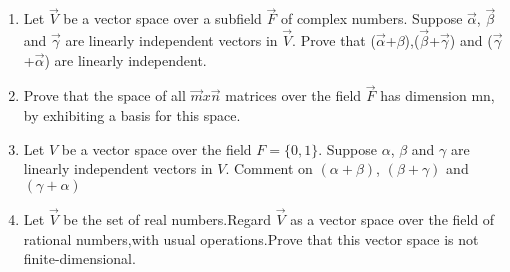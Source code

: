 \begin{enumerate}[label=\thesubsection.\arabic*.,ref=\thesubsection.\theenumi]
%
\\
\solution

%
\item    Let $\vec{V}$ be a vector space over a subfield $\vec{F}$ of complex numbers. Suppose $\vec{\alpha}$, $\vec{\beta}$ and $\vec{\gamma}$ are linearly independent vectors in $\vec{V}$. Prove that ($\vec{\alpha}$+$\beta$),($\vec{\beta}$+$\vec{\gamma}$) and ($\vec{\gamma}$+$\vec{\alpha}$) are linearly independent.
%
\\
\solution

%
\item Prove that the space of all $\vec{m} x \vec{n}$ matrices over the field $\vec{F}$ has dimension mn, by exhibiting a basis for this space. 
%
\\
\solution

%
\item Let $V$ be a vector space over the field $F = \{0,1\}$. Suppose $\alpha$, $\beta$ and $\gamma$ are linearly independent vectors in $V$. Comment on $(\alpha + \beta)$, $(\beta + \gamma)$ and $(\gamma + \alpha)$
%
\\
\solution

\item Let $\vec{V}$ be the set of real numbers.Regard  $\vec{V}$  as a vector space over the field of rational numbers,with usual operations.Prove that this vector space is not finite-dimensional.
\\
\solution

\end{enumerate}
